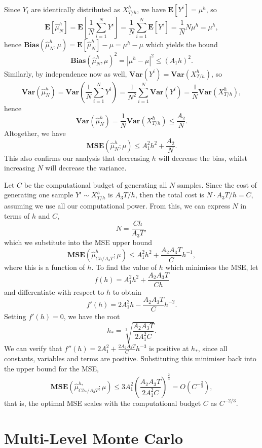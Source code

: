 \documentclass{article}
\begin{document}
Since \(Y_i\) are identically distributed as \(X^h_{T/h}\), we have \(\mathbf{E}[Y^i] = \mu^h\), so
\[ \mathbf{E}[\hat\mu^h_N] = \mathbf{E}\left[\frac{1}{N}\sum_{i=1}^N Y^i\right] = \frac{1}{N}\sum_{i=1}^N\mathbf{E}[Y^i] = \frac{1}{N}N\mu^h = \mu^h, \]
hence \(\mathbf{Bias}(\hat\mu^h_{N}, \mu) = \mathbf{E}[\hat\mu^h_N] - \mu =  \mu^h - \mu\) which yields the bound
\[ \mathbf{Bias}(\hat\mu^h_N, \mu)^2 = |\mu^h - \mu|^2 \leq (A_1h)^2. \]
Similarly, by independence now as well, \(\mathbf{Var}(Y^i) = \mathbf{Var}(X^h_{T/h})\), so
\[ \mathbf{Var}(\hat\mu^h_N) = \mathbf{Var}\left(\frac{1}{N}\sum_{i=1}^N Y^i\right) = \frac{1}{N^2}\sum_{i=1}^N\mathbf{Var}(Y^i) = \frac{1}{N}\mathbf{Var}(X^h_{T/h}), \]
hence 
\[ \mathbf{Var}(\hat\mu^h_{N}) = \frac{1}{N}\mathbf{Var}(X^h_{T/h}) \leq \frac{A_2}{N}. \]
Altogether, we have
\[ \mathbf{MSE}(\hat\mu^h_N; \mu) \leq A_1^2h^2 + \frac{A_2}{N}. \]
This also confirms our analysis that decreasing \(h\) will decrease the bias, whilst increasing \(N\) will decrease the variance.

Let \(C\) be the computational budget of generating all \(N\) samples. Since the cost of generating one sample \(Y^i \sim X^h_{T/h}\) is \(A_3T/h\), then the total cost is \(N \cdot A_3T/h = C\), assuming we use all our computational power. From this, we can express \(N\) in terms of \(h\) and \(C\),
\[ N = \frac{Ch}{A_3T}, \]
which we substitute into the MSE upper bound
\[ \mathbf{MSE}(\hat\mu^h_{Ch/A_3T}; \mu) \leq A_1^2h^2 + \frac{A_2A_3T}{C}h^{-1}, \]
where this is a function of \(h\). To find the value of \(h\) which minimises the MSE, let
\[ f(h) = A_1^2h^2 + \frac{A_2A_3T}{Ch} \]
and differentiate with respect to \(h\) to obtain
\[ f'(h) = 2A_1^2h - \frac{A_2A_3T}{C}h^{-2}. \]
Setting \(f'(h) = 0\), we have the root
\[ h_* = \sqrt[3]{\frac{A_2A_3T}{2A_1^2C}}. \]
We can verify that \(f''(h) = 2A_1^2 + \frac{2A_2A_3T}{C}h^{-3} \) is positive at \(h_*\), since all constants, variables and terms are positive. Substituting this minimiser back into the upper bound for the MSE, 
\[ \mathbf{MSE}(\hat\mu^{h_*}_{Ch_*/A_3T}; \mu) \leq 3A_1^2\left(\frac{A_2A_3T}{2A_1^2C}\right)^{\frac{2}{3}} = O(C^{-\frac{2}{3}}), \]
that is, the optimal MSE scales with the computational budget \(C\) as \(C^{-2/3}\).

\section{Multi-Level Monte Carlo}
\end{document}
